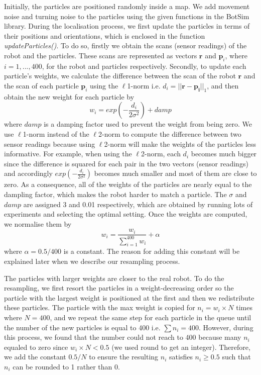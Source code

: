 Initially, the particles are positioned randomly inside a map. We add movement noise and turning noise to the particles using the given functions in the BotSim library. During the localisation process, we first update the particles in terms of their positions and orientations, which is enclosed in the function {\itshape updateParticles()}. To do so, firstly we obtain the scans (sensor readings) of the robot and the particles. These scans are represented as vectors $\mathbf{r}$ and $\mathbf{p}_{i}$, where $i = 1, ..., 400$, for the robot and particles respectively. Secondly, to update each particle's weights, we calculate the difference between the scan of the robot $\mathbf{r}$ and the scan of each particle $\mathbf{p}_{i}$ using the $\ell$1-norm i.e. $d_{i} = ||\mathbf{r} - \mathbf{p_{i}}||_{1}$, and then obtain the new weight for each particle by $$w_{i} = exp(-\frac{d_{i}}{2\sigma^{2}}) + damp$$ where $damp$ is a damping factor used to prevent the weight from being zero. We use $\ell$1-norm instead of the $\ell$2-norm to compute the difference between two sensor readings because using $\ell$2-norm will make the weights of the particles less informative. For example, when using the $\ell$2-norm, each $d_{i}$ becomes much bigger since the difference is squared for each pair in the two vectors (sensor readings) and accordingly $exp(-\frac{d_{i}}{2\sigma^{2}})$ becomes much smaller and most of them are close to zero. As a consequence, all of the weights of the particles are nearly equal to the dampling factor, which makes the robot harder to match a particle. The $\sigma$ and $damp$ are assigned 3 and 0.01 respectively, which are obtained by running lots of experiments and selecting the optimal setting. Once the weights are computed, we normalise them by  $$w_{i} = \frac{w_{i}}{\sum_{i = 1}^{400}w_{i}} + \alpha$$ where $\alpha = 0.5/400$ is a constant. The reason for adding this constant will be explained later when we describe our resampling process.

The particles with larger weights are closer to the real robot. To do the resampling, we first resort the particles in a weight-decreasing order so the particle with the largest weight is positioned at the first and then we redistribute these particles. The particle with the max weight is copied for $n_{i} = w_{i}\times N$ times where $N=400$, and we repeat the same step for each particle in the queue until the number of the new particles is equal to 400 i.e. $\sum n_{i}=400$. However, during this process, we found that the number could not reach to 400 because many $n_{i}$ equaled to zero since $w_{i}\times N < 0.5$ (we used round to get an integer). Therefore, we add the constant $0.5/N$ to ensure the resulting $n_{i}$ satisfies $n_{i}\ge 0.5$ such that $n_{i}$ can be rounded to 1 rather than 0.

